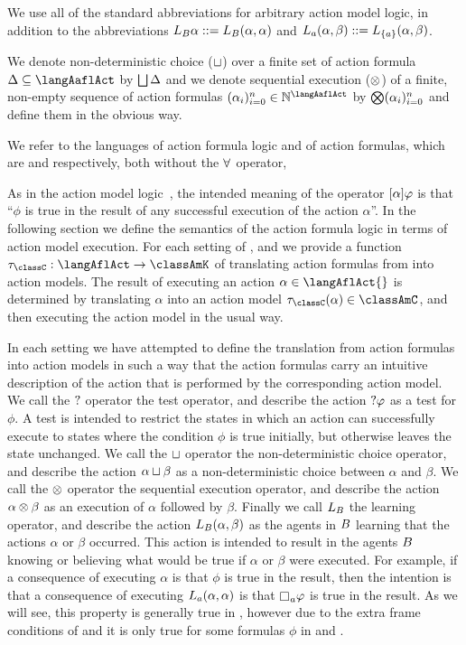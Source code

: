 We use all of the standard abbreviations for arbitrary action model logic, in addition to the abbreviations $\learnsBs \alpha ::= \learnsBs (\alpha, \alpha)$ and $\learnsA (\alpha, \beta) ::= \learns[{\{\agentA\}}] (\alpha, \beta)$.

We denote non-deterministic choice ($\choice$) over a finite set of action formula $\Delta \subseteq \langAaflAct$ by $\bigchoice \Delta$ and we denote sequential execution ($\compose$) of a finite, non-empty sequence of action formulas $(\alpha_i)_{i=0}^{n} \in \mathbb{N}^\langAaflAct$ by $\bigcompose (\alpha_i)_{i=0}^{n}$ and define them in the obvious way.

We refer to the languages \langAfl{} of action formula logic and \langAflAct{} of action formulas, which are \langAafl{} and \langAaflAct{} respectively, both without the $\allrefs$ operator, 

As in the action model logic~\cite{baltag:2004}, the intended meaning of the operator $\actionA{\alpha} \phi$ is that ``$\phi$ is true in the result of any successful execution of the action $\alpha$''.
In the following section we define the semantics of the action formula logic in terms of action model execution.
For each setting of \classK{}, \classKFF{} and \classS{} we provide a function $\tau_\classC : \langAflAct \to \classAmK$ of translating action formulas from \langAflAct{} into action models.
The result of executing an action $\alpha \in \langAflAct{}$ is determined by translating $\alpha$ into an action model $\tau_\classC(\alpha) \in \classAmC$, and then executing the action model in the usual way.

In each setting we have attempted to define the translation from action formulas into action models in such a way that the action formulas carry an intuitive description of the action that is performed by the corresponding action model.
We call the $\test{}$ operator the test operator, and describe the action $\test{\phi}$ as a test for $\phi$.
A test is intended to restrict the states in which an action can successfully execute to states where the condition $\phi$ is true initially, but otherwise leaves the state unchanged. 
We call the $\choice$ operator the non-deterministic choice operator, and describe the action $\alpha \choice \beta$ as a non-deterministic choice between $\alpha$ and $\beta$.
We call the $\compose$ operator the sequential execution operator, and describe the action $\alpha \compose \beta$ as an execution of $\alpha$ followed by $\beta$. 
Finally we call $\learnsBs$ the learning operator, and describe the action $\learnsBs (\alpha, \beta)$ as the agents in $\agentsB$ learning that the actions $\alpha$ or $\beta$ occurred.
This action is intended to result in the agents $\agentsB$ knowing or believing what would be true if $\alpha$ or $\beta$ were executed.
For example, if a consequence of executing $\alpha$ is that $\phi$ is true in the result, then the intention is that a consequence of executing $\learnsA (\alpha, \alpha)$ is that $\knows_\agentA \phi$ is true in the result.
As we will see, this property is generally true in \logicAflK{}, however due to the extra frame conditions of \classKFF{} and \classS{} it is only true for some formulas $\phi$ in \logicAflKFF{} and \logicAflS{}.

